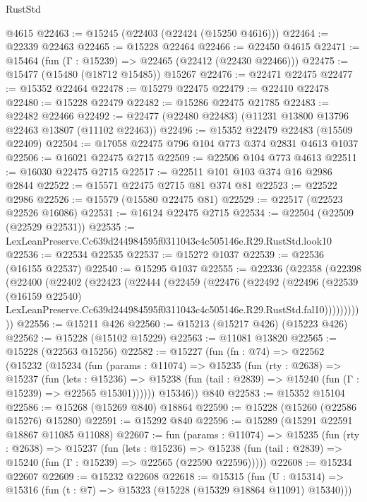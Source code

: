 \begin{lexlean}{RustStd}
\begin{coremodule}
    @4615
@22463 := @15245 (@22403 (@22424 (@15250 @4616)))
@22464 := @22339 @22463
@22465 := @15228 @22464
@22466 := @22450 @4615
@22471 := @15464 (fun (Γ : @15239) => @22465 (@22412 (@22430 @22466)))
@22475 := @15477 (@15480 (@18712 @15485)) @15267
@22476 := @22471 @22475
@22477 := @15352 @22464
@22478 := @15279 @22475
@22479 := @22410 @22478
@22480 := @15228 @22479
@22482 := @15286 @22475 @21785
@22483 := @22482 @22466
@22492 := @22477 (@22480 @22483) (@11231 @13800 @13796 @22463 @13807 (@11102 @22463))
@22496 := @15352 @22479 @22483 (@15509 @22409)
@22504 := @17058 @22475 @796 @104 @773 @374 @2831 @4613 @1037
@22506 := @16021 @22475 @2715
@22509 := @22506 @104 @773 @4613
@22511 := @16030 @22475 @2715
@22517 := @22511 @101 @103 @374 @16 @2986 @2844
@22522 := @15571 @22475 @2715 @81 @374 @81
@22523 := @22522 @2986
@22526 := @15579 (@15580 @22475 @81)
@22529 := @22517 (@22523 @22526 @16086)
@22531 := @16124 @22475 @2715
@22534 := @22504 (@22509 (@22529 @22531))
@22535 := LexLeanPreserve.Cc639d244984595f0311043c4c505146e.R29.RustStd.look10
@22536 := @22534 @22535
@22537 := @15272 @1037
@22539 := @22536 (@16155 @22537)
@22540 := @15295 @1037
@22555 := @22336
    (@22358
      (@22398
        (@22400
          (@22402
            (@22423
              (@22444
                (@22459
                  (@22476
                    (@22492
                      (@22496
                        (@22539
                          (@16159 @22540)
                          LexLeanPreserve.Cc639d244984595f0311043c4c505146e.R29.RustStd.fal10)))))))))))
@22556 := @15211 @426
@22560 := @15213 (@15217 @426) (@15223 @426)
@22562 := @15228 (@15102 @15229)
@22563 := @11081 @13820
@22565 := @15228 (@22563 @15256)
@22582 := @15227
    (fun (fn : @74) =>
    @22562
      (@15232
        (@15234
          (fun (params : @11074) =>
          @15235
            (fun (rty : @2638) =>
            @15237
              (fun (lets : @15236) =>
              @15238 (fun (tail : @2839) => @15240 (fun (Γ : @15239) => @22565 @15301))))))
        @15346))
    @840
@22583 := @15352 @15104
@22586 := @15268 (@15269 @840) @18864
@22590 := @15228 (@15260 (@22586 @15276) @15280)
@22591 := @15292 @840
@22596 := @15289 (@15291 @22591 @18867 @11085 @11088)
@22607 := fun (params : @11074) =>
  @15235
    (fun (rty : @2638) =>
    @15237
      (fun (lets : @15236) =>
      @15238 (fun (tail : @2839) => @15240 (fun (Γ : @15239) => @22565 (@22590 @22596)))))
@22608 := @15234 @22607
@22609 := @15232 @22608
@22618 := @15315
    (fun (U : @15314) => @15316 (fun (t : @7) => @15323 (@15228 (@15329 @18864 @11091) @15340)))

\end{coremodule}
\end{lexlean}
